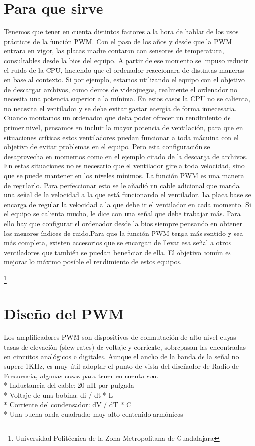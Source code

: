 \documentclass[12pt,a4paper]{article}
\begin{document}
\section{Para que sirve}
Tenemos que tener en cuenta distintos factores a la hora de hablar de los usos prácticos de la función PWM. Con el paso de los años y desde que la PWM entrara en vigor, las placas madre contaron con sensores de temperatura, consultables desde la bios del equipo. A partir de ese momento se impuso reducir el ruido de la CPU, haciendo que el ordenador reaccionara de distintas maneras en base al contexto. Si por ejemplo, estamos utilizando el equipo con el objetivo de descargar archivos, como demos de videojuegos, realmente el ordenador no necesita una potencia superior a la mínima. En estos casos la CPU no se calienta, no necesita el ventilador y se debe evitar gastar energía de forma innecesaria.\\

Cuando montamos un ordenador que deba poder ofrecer un rendimiento de primer nivel, pensamos en incluir la mayor potencia de ventilación, para que en situaciones críticas estos ventiladores puedan funcionar a toda máquina con el objetivo de evitar problemas en el equipo. Pero esta configuración se desaprovecha en momentos como en el ejemplo citado de la descarga de archivos. En estas situaciones no es necesario que el ventilador gire a toda velocidad, sino que se puede mantener en los niveles mínimos. La función PWM es una manera de regularlo. Para perfeccionar esto se le añadió un cable adicional que manda una señal de la velocidad a la que está funcionando el ventilador. La placa base se encarga de regular la velocidad a la que debe ir el ventilador en cada momento. Si el equipo se calienta mucho, le dice con una señal que debe trabajar más. Para ello hay que configurar el ordenador desde la bios siempre pensando en obtener los menores índices de ruido.Para que la función PWM tenga más sentido y sea más completa, existen accesorios que se encargan de llevar esa señal a otros ventiladores que también se puedan beneficiar de ella. El objetivo común es mejorar lo máximo posible el rendimiento de estos equipos.

\footnote{Universidad Politécnica de la Zona Metropolitana de Guadalajara}

\newpage
\section{Diseño del PWM}
Los amplificadores PWM  son dispositivos de conmutación de alto nivel cuyas tasas de elevación (slew rates) de voltaje y corriente, sobrepasan las encontradas en circuitos analógicos o digitales. Aunque el ancho de la banda de la señal no supere 1KHz, es muy útil adoptar el punto de vista del diseñador de Radio de Frecuencia; algunas cosas para tener en cuenta son: \\
* Inductancia del cable: 20 nH por pulgada\\
* Voltaje de una bobina: di / dt * L\\
* Corriente del condensador: dV / dT * C\\
* Una buena onda cuadrada: muy alto contenido armónicos\\
\end{document}
